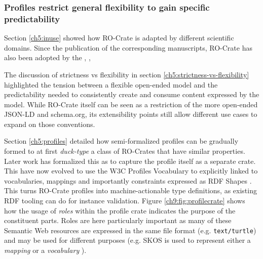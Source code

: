 \subsubsection{Profiles restrict general flexibility to gain specific predictability}\label{ch60:profiles}

Section \vref{ch5:inuse} showed how RO-Crate is adapted by different scientific domains. 
Since the publication of the corresponding manuscripts, RO-Crate has also been adopted by the  \cite{LREC2022},  \cite{surveyOntology}, 

The discussion of strictness vs flexibility in section \vref{ch5:strictness-vs-flexibility} highlighted the tension between a flexible open-ended model and the predictability needed to consistently create and consume content expressed by the model.
While RO-Crate itself can be seen as a restriction of the more open-ended JSON-LD and schema.org, its extensibility points still allow different use cases to expand on those conventions.  

Section \vref{ch5:profiles} detailed how semi-formalized profiles can be gradually formed to at first \emph{duck-type} a class of RO-Crates that have similar properties.
Later work has formalized this as  to capture the profile itself as a separate crate. This have now evolved to use the W3C Profiles Vocabulary \cite{dx-prof} to explicitly linked to vocabularies, mappings and importantly constraints expressed as RDF Shapes \cite{fdo-collections}. 
This turns RO-Crate profiles into machine-actionable type definitions, as existing RDF tooling can do for instance validation. 
Figure \vref{ch9:fig:profilecrate} shows how the usage of \emph{roles} within the profile crate indicates the purpose of the constituent parts.
Roles are here particularly important as many of these Semantic Web resources are expressed in the same file format (e.g. \texttt{text/turtle}) and may be used for different purposes (e.g.
SKOS is used to represent either a \emph{mapping} or a \emph{vocabulary} \cite{w3-skos-primer}).

